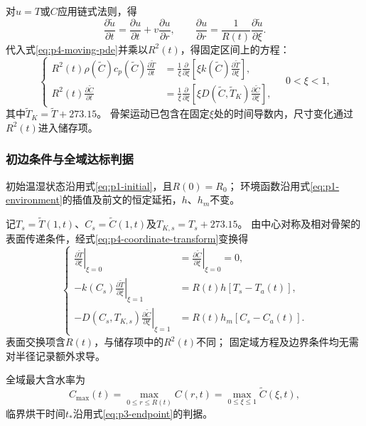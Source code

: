 
对$u=T$或$C$应用链式法则，得
\begin{equation}
  \frac{\partial\widetilde u}{\partial t}
    =\frac{\partial u}{\partial t}
      +v\frac{\partial u}{\partial r},\qquad
  \frac{\partial u}{\partial r}
    =\frac{1}{R(t)}\frac{\partial\widetilde u}{\partial\xi}.
  \label{eq:p4-coordinate-transform}
\end{equation}
代入式\eqref{eq:p4-moving-pde}并乘以$R^2(t)$，得固定区间上的方程：
\begin{equation}
\left\{
\begin{aligned}
  R^2(t)\rho(\widetilde C)c_p(\widetilde C)
    \frac{\partial\widetilde T}{\partial t}
    &=\frac{1}{\xi}\frac{\partial}{\partial\xi}
      \left[\xi k(\widetilde C)
      \frac{\partial\widetilde T}{\partial\xi}\right],\\
  R^2(t)\frac{\partial\widetilde C}{\partial t}
    &=\frac{1}{\xi}\frac{\partial}{\partial\xi}
      \left[\xi D(\widetilde C,\widetilde T_K)
      \frac{\partial\widetilde C}{\partial\xi}\right],
\end{aligned}
\right.
\quad 0<\xi<1,
\label{eq:p4-fixed-pde}
\end{equation}
其中$\widetilde T_K=\widetilde T+273.15$。
骨架运动已包含在固定$\xi$处的时间导数内，尺寸变化通过$R^2(t)$进入储存项。

\subsubsection{初边条件与全域达标判据}

初始温湿状态沿用式\eqref{eq:p1-initial}，且$R(0)=R_0$；
环境函数沿用式\eqref{eq:p1-environment}的插值及前文的恒定延拓，$h$、$h_m$不变。

记$T_s=\widetilde T(1,t)$、$C_s=\widetilde C(1,t)$及$T_{K,s}=T_s+273.15$。
由中心对称及相对骨架的表面传递条件，经式\eqref{eq:p4-coordinate-transform}变换得
\begin{equation}
\left\{
\begin{aligned}
  \left.\frac{\partial\widetilde T}{\partial\xi}\right|_{\xi=0}
    &=\left.\frac{\partial\widetilde C}{\partial\xi}\right|_{\xi=0}=0,\\
  -k(C_s)\left.\frac{\partial\widetilde T}{\partial\xi}\right|_{\xi=1}
    &=R(t)h[T_s-T_a(t)],\\
  -D(C_s,T_{K,s})\left.\frac{\partial\widetilde C}{\partial\xi}\right|_{\xi=1}
    &=R(t)h_m[C_s-C_a(t)].
\end{aligned}
\right.
\label{eq:p4-boundary}
\end{equation}
表面交换项含$R(t)$，与储存项中的$R^2(t)$不同；
固定域方程及边界条件均无需对半径记录额外求导。

全域最大含水率为
\begin{equation}
  C_{\max}(t)=\max_{0\le r\le R(t)}C(r,t)
    =\max_{0\le\xi\le1}\widetilde C(\xi,t),
  \label{eq:p4-maximum}
\end{equation}
临界烘干时间$t_*$沿用式\eqref{eq:p3-endpoint}的判据。
